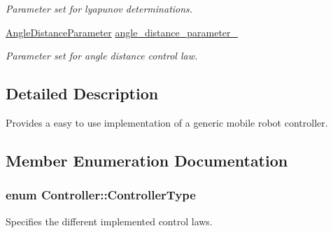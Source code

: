 \begin{DoxyCompactItemize}
\begin{DoxyCompactList}\small\item\em Parameter set for lyapunov determinations. \end{DoxyCompactList}\item 
\hyperlink{structController_1_1AngleDistanceParameter}{Angle\+Distance\+Parameter} \hyperlink{classController_a139044e195ddf6a1378311e1b08c14bb}{angle\+\_\+distance\+\_\+parameter\+\_\+}\hypertarget{classController_a139044e195ddf6a1378311e1b08c14bb}{}\label{classController_a139044e195ddf6a1378311e1b08c14bb}

\begin{DoxyCompactList}\small\item\em Parameter set for angle distance control law. \end{DoxyCompactList}\end{DoxyCompactItemize}


\subsection{Detailed Description}
Provides a easy to use implementation of a generic mobile robot controller. 

\subsection{Member Enumeration Documentation}
\subsubsection[{\texorpdfstring{Controller\+Type}{ControllerType}}]{\setlength{\rightskip}{0pt plus 5cm}enum {\bf Controller\+::\+Controller\+Type}}\hypertarget{classController_aa6d956c4c220461a4152415ffa78690a}{}\label{classController_aa6d956c4c220461a4152415ffa78690a}


Specifies the different implemented control laws. 

